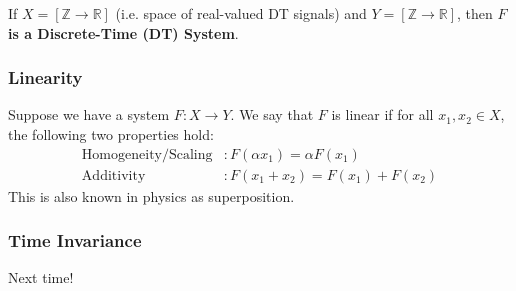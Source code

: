 If $X = [\mathbb{Z} \rightarrow \mathbb{R}]$ (i.e. space of real-valued DT signals) and $Y = [\mathbb{Z} \rightarrow \mathbb{R}]$, then \textbf{$F$ is a Discrete-Time (DT) System}.

\subsubsection{Linearity}
Suppose we have a system $F: X \rightarrow Y$. We say that $F$ is linear if for all $x_1, x_2 \in X$, the following two properties hold:
\begin{align*}
    \text{Homogeneity/Scaling} & : F(\alpha x_1) = \alpha F(x_1) \\
    \text{Additivity} & : F(x_1 + x_2) = F(x_1) + F(x_2)
\end{align*}
This is also known in physics as superposition.

\subsubsection{Time Invariance}

Next time!
